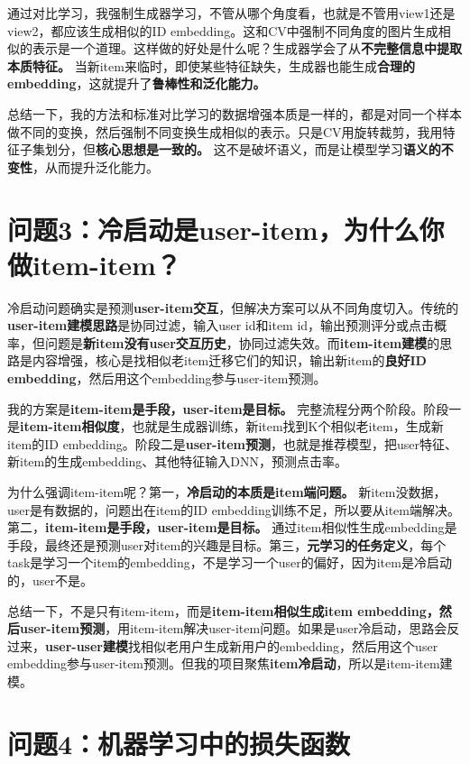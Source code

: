 \documentclass[UTF8]{ctexart}
\begin{document}
通过对比学习，我强制生成器学习，不管从哪个角度看，也就是不管用view1还是view2，都应该生成相似的ID embedding。这和CV中强制不同角度的图片生成相似的表示是一个道理。这样做的好处是什么呢？生成器学会了从\textbf{不完整信息中提取本质特征。} 当新item来临时，即使某些特征缺失，生成器也能生成\textbf{合理的embedding}，这就提升了\textbf{鲁棒性和泛化能力。}

总结一下，我的方法和标准对比学习的数据增强本质是一样的，都是对同一个样本做不同的变换，然后强制不同变换生成相似的表示。只是CV用旋转裁剪，我用特征子集划分，但\textbf{核心思想是一致的。} 这不是破坏语义，而是让模型学习\textbf{语义的不变性}，从而提升泛化能力。

\section{问题3：冷启动是user-item，为什么你做item-item？}

冷启动问题确实是预测\textbf{user-item交互}，但解决方案可以从不同角度切入。传统的\textbf{user-item建模思路}是协同过滤，输入user id和item id，输出预测评分或点击概率，但问题是\textbf{新item没有user交互历史}，协同过滤失效。而\textbf{item-item建模}的思路是内容增强，核心是找相似老item迁移它们的知识，输出新item的\textbf{良好ID embedding}，然后用这个embedding参与user-item预测。

我的方案是\textbf{item-item是手段，user-item是目标。} 完整流程分两个阶段。阶段一是\textbf{item-item相似度}，也就是生成器训练，新item找到K个相似老item，生成新item的ID embedding。阶段二是\textbf{user-item预测}，也就是推荐模型，把user特征、新item的生成embedding、其他特征输入DNN，预测点击率。

为什么强调item-item呢？第一，\textbf{冷启动的本质是item端问题。} 新item没数据，user是有数据的，问题出在item的ID embedding训练不足，所以要从item端解决。第二，\textbf{item-item是手段，user-item是目标。} 通过item相似性生成embedding是手段，最终还是预测user对item的兴趣是目标。第三，\textbf{元学习的任务定义}，每个task是学习一个item的embedding，不是学习一个user的偏好，因为item是冷启动的，user不是。

总结一下，不是只有item-item，而是\textbf{item-item相似生成item embedding，然后user-item预测}，用item-item解决user-item问题。如果是user冷启动，思路会反过来，\textbf{user-user建模}找相似老用户生成新用户的embedding，然后用这个user embedding参与user-item预测。但我的项目聚焦\textbf{item冷启动}，所以是item-item建模。

\section{问题4：机器学习中的损失函数}
\end{document}
